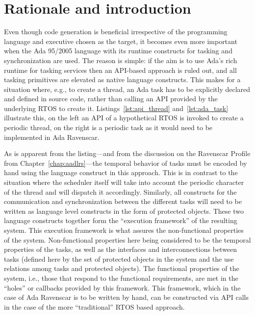 \section{Rationale and introduction}
Even though code generation is beneficial irrespective of the
programming language and executive chosen as the target, it becomes
even more important when the Ada 95/2005 language with its runtime
constructs for tasking and synchronization are used. The reason is
simple: if the aim is to use Ada's rich runtime for tasking services
then an API-based approach is ruled out, and all tasking primitives
are elevated as native language constructs. This makes for a situation
where, e.g., to create a thread, an Ada task has to be explicitly
declared and defined in source code, rather than calling an API
provided by the underlying RTOS to create
it. Listings~\ref{lst:api_thread} and~\ref{lst:ada_task} illustrate
this, on the left an API of a hypothetical RTOS is invoked to create a
periodic thread, on the right is a periodic task as it would need to
be implemented in Ada Ravenscar.

As is apparent from the listing---and from the discussion on the
Ravenscar Profile from Chapter~\ref{chap:aadlrs}---the temporal
behavior of tasks must be encoded by hand using the language construct
 in this approach. This is in contrast to the
situation where the scheduler itself will take into account the
periodic character of the thread and will dispatch it
accordingly. Similarly, all constructs for the communication and
synchronization between the different tasks will need to be written as
language level constructs in the form of protected objects. These two
language constructs together form the ``execution framework'' of the
resulting system. This execution framework is what assures the
non-functional properties of the system. Non-functional properties
here being considered to be the temporal properties of the tasks, as
well as the interfaces and interconnections between tasks (defined
here by the set of protected objects in the system and the use
relations among tasks and protected objects). The functional
properties of the system, i.e., those that respond to the functional
requirements, are met in the ``holes'' or callbacks provided by this
framework. This framework, which in the case of Ada Ravenscar is to be
written by hand, can be constructed via API calls in the case of the
more ``traditional'' RTOS based approach.


